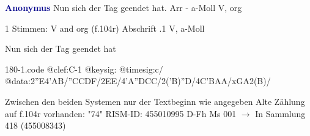 \documentclass[twocolumn]{book}
\begin{document}
\newline \par \vspace{7pt} \textcolor{darkblue}{\textbf{Anonymus  }}
\newline Nun sich der Tag geendet hat. Arr - a-Moll
\newline V, org
\newline \begin{itshape}\end{itshape} 
\newline \textcolor{darkblue}{}  1 Stimmen: V and org  (f.104r)
\newline Abschrift
.1  V, a-Moll
\newline \begin{footnotesize} Nun sich der Tag geendet hat \end{footnotesize}  
\begin{filecontents*}{180-1.code}
@clef:C-1
@keysig:
@timesig:c/
@data:2''E4'AB/''CCDF/2EE/4'A''DCC/2('B)''D/4C'BAA/xGA2(B)/
\end{filecontents*}
\newline
%
\newline Zwischen den beiden Systemen nur der Textbeginn wie angegeben
\newline Alte Zählung auf f.104r vorhanden: "74"
\newline RISM-ID: 455010995
\newline D-Fh  Ms 001
\newline $\rightarrow$ In Sammlung 418 (455008343)
      
\end{document}
